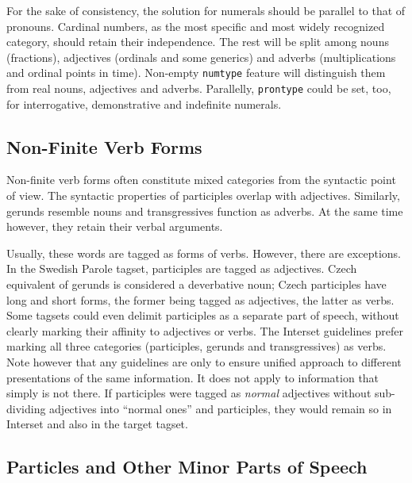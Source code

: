 \documentclass[11pt]{article}
\newcommand{\XXX}{\textcolor{red}{XXX }} %
\begin{document}
For the sake of consistency, the solution for numerals should be parallel to that of pronouns. Cardinal numbers, as the most specific and most widely recognized category, should retain their independence. The rest will be split among nouns (fractions), adjectives (ordinals and some generics) and adverbs (multiplications and ordinal points in time). Non-empty \texttt{numtype} feature will distinguish them from real nouns, adjectives and adverbs. Parallelly, \texttt{prontype} could be set, too, for interrogative, demonstrative and indefinite numerals.


\subsection{Non-Finite Verb Forms}
\label{sec:participles}

Non-finite verb forms often constitute mixed categories from the syntactic point of view. The syntactic properties of participles overlap with adjectives. Similarly, gerunds resemble nouns and transgressives function as adverbs. At the same time however, they retain their verbal arguments.

Usually, these words are tagged as forms of verbs. However, there are exceptions. In the Swedish Parole tagset, participles are tagged as adjectives. Czech equivalent of gerunds is considered a deverbative noun; Czech participles have long and short forms, the former being tagged as adjectives, the latter as verbs. Some tagsets could even delimit participles as a separate part of speech, without clearly marking their affinity to adjectives or verbs. The Interset guidelines prefer marking all three categories (participles, gerunds and transgressives) as verbs.
Note however that any guidelines are only to ensure unified approach to different presentations of the same information. It does not apply to information that simply is not there. If participles were tagged as \textit{normal} adjectives without sub-dividing adjectives into ``normal ones'' and participles, they would remain so in Interset and also in the target tagset.

\subsection{Particles and Other Minor Parts of Speech}
\label{sec:particles}
\end{document}
